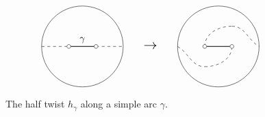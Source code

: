 \documentclass[12pt]{amsart}
\numberwithin{equation}{section}
\theoremstyle{plain}
\theoremstyle{definition}
\begin{document}
\begin{figure}[h]
    \centering
    \begin{displaymath}
        \begin{tikzpicture}
            \draw (0, 1.5) circle[radius=1.5];
            \draw[thick] (-0.5, 1.5)--(0.5, 1.5);
            \draw[dashed] (-1.5, 1.5)--(-0.5, 1.5);
            \draw[dashed] (0.5, 1.5)--(1.5, 1.5);

            \foreach \u in {-0.5, 0.5}
                {
                    \filldraw[white] (\u, 1.5) circle (2pt);
                    \draw[black] (\u, 1.5) circle (2pt);
                }
            \draw(0, 1.5) node[above]{$\gamma$};

            \draw(2.5, 1.5) node{\Large$\rightarrow$};

            \draw (0+5, 1.5) circle[radius=1.5];
            \draw[thick] (-0.5+5, 1.5)--(0.5+5, 1.5);

            \draw[dashed](-1.5+5, 1.5) to[out=-30,in=180](-0.5+5, 0.75);
            \draw[dashed](-0.5+5, 0.75) to[out=0,in=-90](0.5+5, 1.5);

            \draw[dashed](-0.5+5, 1.5) to[out=90,in=180](0.5+5, 2.25);
            \draw[dashed](0.5+5, 2.25) to[out=0,in=150](1.5+5, 1.5);


            \foreach \u in {-0.5, 0.5}
                {
                    \filldraw[white] (\u+5, 1.5) circle (2pt);
                    \draw[black] (\u+5, 1.5) circle (2pt);
                }
        \end{tikzpicture}
    \end{displaymath}
    \caption{The half twist $h_\gamma$ along a simple arc $\gamma$.}
    \label{fig:half-twist}
\end{figure}
\end{document}

